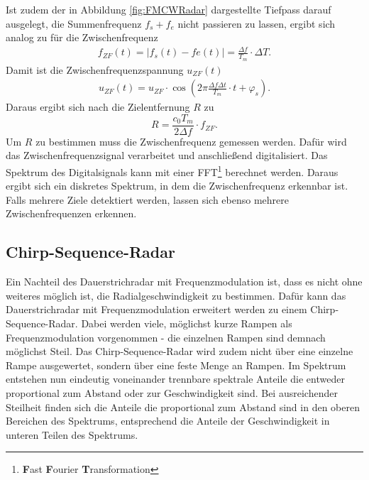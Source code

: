 Ist zudem der in Abbildung \ref{fig:FMCWRadar} dargestellte Tiefpass darauf ausgelegt, die Summenfrequenz $f_{s} + f_{e}$ nicht passieren zu lassen, ergibt sich analog zu \cite[S.43,S.44]{HuderRadar} für die Zwischenfrequenz
\begin{align}
f_{ZF}(t) = \vert f_{s}(t)- f{e}(t) \vert = \frac{\Delta f}{T_{m}}\cdot \Delta T.
\end{align}
Damit ist die Zwischenfrequenzspannung $u_{ZF}(t)$ 
\begin{align}
u_{ZF}(t) = u_{ZF} \cdot  \cos\left( 2\pi \frac{\Delta f \Delta t}{T_{m}} \cdot t + \varphi_{s} \right) .
\end{align}
Daraus ergibt sich nach\cite[S.80]{HuderRadar} die Zielentfernung $R$ zu
\begin{equation}
R = \frac{c_{0}T_{m}}{2\Delta f}\cdot f_{ZF}.
\end{equation}
Um $R$ zu bestimmen muss die Zwischenfrequenz gemessen werden. Dafür wird das Zwischenfrequenzsignal verarbeitet und anschließend digitalisiert. Das Spektrum des Digitalsignals kann mit einer FFT\footnote{\textbf{F}ast \textbf{F}ourier \textbf{T}ransformation} berechnet werden. Daraus ergibt sich ein diskretes Spektrum, in dem die Zwischenfrequenz erkennbar ist. Falls mehrere Ziele detektiert werden, lassen sich ebenso mehrere Zwischenfrequenzen erkennen.
\subsection{Chirp-Sequence-Radar}
Ein Nachteil des Dauerstrichradar mit Frequenzmodulation ist, dass es nicht ohne weiteres möglich ist, die Radialgeschwindigkeit zu bestimmen. Dafür kann das Dauerstrichradar mit Frequenzmodulation erweitert werden zu einem Chirp-Sequence-Radar. Dabei werden viele, möglichst kurze Rampen als Frequenzmodulation vorgenommen - die einzelnen Rampen sind demnach möglichst Steil. Das Chirp-Sequence-Radar wird zudem nicht über eine einzelne Rampe ausgewertet, sondern über eine feste Menge an Rampen. Im Spektrum entstehen nun eindeutig voneinander trennbare spektrale Anteile die entweder proportional zum Abstand oder zur Geschwindigkeit sind. Bei ausreichender Steilheit finden sich die Anteile die proportional zum Abstand sind in den oberen Bereichen des Spektrums, entsprechend die Anteile der Geschwindigkeit in unteren Teilen des Spektrums. 